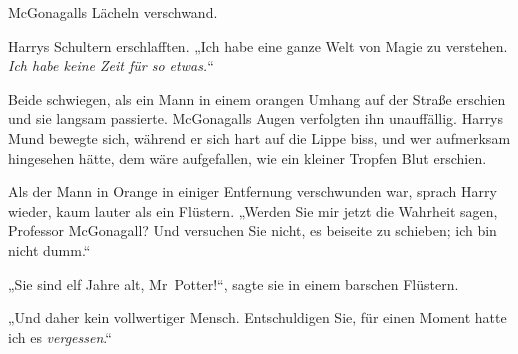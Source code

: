 McGonagalls Lächeln verschwand.

Harrys Schultern erschlafften. „Ich habe eine ganze Welt von Magie zu verstehen. \emph{Ich habe keine Zeit für so etwas.}“

Beide schwiegen, als ein Mann in einem orangen Umhang auf der Straße erschien und sie langsam passierte. McGonagalls Augen verfolgten ihn unauffällig. Harrys Mund bewegte sich, während er sich hart auf die Lippe biss, und wer aufmerksam hingesehen hätte, dem wäre aufgefallen, wie ein kleiner Tropfen Blut erschien.

Als der Mann in Orange in einiger Entfernung verschwunden war, sprach Harry wieder, kaum lauter als ein Flüstern. „Werden Sie mir jetzt die Wahrheit sagen, Professor McGonagall? Und versuchen Sie nicht, es beiseite zu schieben; ich bin nicht dumm.“

„Sie sind elf Jahre alt, Mr~Potter!“, sagte sie in einem barschen Flüstern.

„Und daher kein vollwertiger Mensch. Entschuldigen Sie, für einen Moment hatte ich es \emph{vergessen}.“

